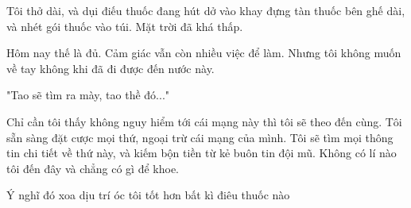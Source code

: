Tôi thở dài, và dụi điếu thuốc đang hút dở vào khay đựng tàn thuốc bên ghế dài, và nhét gói thuốc vào túi. Mặt trời đã khá thấp.

Hôm nay thế là đủ. Cảm giác vẫn còn nhiều việc để làm. Nhưng tôi không muốn về tay không khi đã đi được đến nước này.

"Tao sẽ tìm ra mày, tao thề đó..."

Chỉ cần tôi thấy không nguy hiểm tới cái mạng này thì tôi sẽ theo đến cùng. Tôi sẵn sàng đặt cược mọi thứ, ngoại trừ cái mạng của mình. Tôi sẽ tìm mọi thông tin chi tiết về thứ này, và kiếm bộn tiền từ kẻ buôn tin đội mũ. Không có lí nào tôi đến đây và chẳng có gì để khoe.

Ý nghĩ đó xoa dịu trí óc tôi tốt hơn bất kì điêu thuốc nào \\








